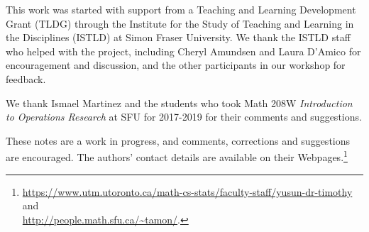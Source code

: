 \vspace{4mm}
This work was started with support from a Teaching and Learning Development Grant (TLDG)
through the Institute for the Study of Teaching and Learning in the Disciplines
(ISTLD) at Simon Fraser University.  We thank the ISTLD staff who helped with
the project, including Cheryl Amundsen and Laura D'Amico for encouragement
and discussion, and the other participants in our workshop for feedback.

We thank Ismael Martinez and the students who took Math 208W \textit{Introduction to Operations Research}
at SFU for 2017-2019 for their comments and suggestions.

\vspace{4mm}
These notes are a work in progress, and comments, corrections and suggestions are encouraged.
The authors' contact details are available on their Webpages.\footnote{\url{https://www.utm.utoronto.ca/math-cs-stats/faculty-staff/yusun-dr-timothy} and \\ 
\url{http://people.math.sfu.ca/~tamon/}.}

\thispagestyle{plain} %
